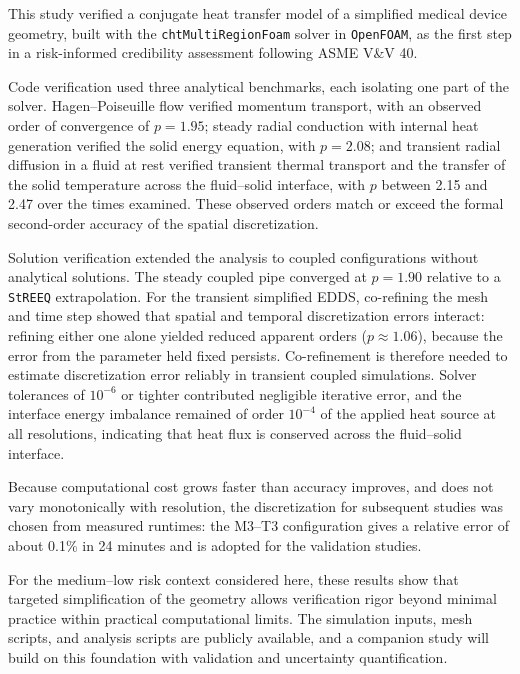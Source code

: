 This study verified a conjugate heat transfer model of a simplified medical device geometry, built with the \texttt{chtMultiRegionFoam} solver in \texttt{OpenFOAM}, as the first step in a risk-informed credibility assessment following ASME V\&V 40.

Code verification used three analytical benchmarks, each isolating one part of the solver. Hagen--Poiseuille flow verified momentum transport, with an observed order of convergence of $p = 1.95$; steady radial conduction with internal heat generation verified the solid energy equation, with $p = 2.08$; and transient radial diffusion in a fluid at rest verified transient thermal transport and the transfer of the solid temperature across the fluid--solid interface, with $p$ between 2.15 and 2.47 over the times examined. These observed orders match or exceed the formal second-order accuracy of the spatial discretization.

Solution verification extended the analysis to coupled configurations without analytical solutions. The steady coupled pipe converged at $p = 1.90$ relative to a \texttt{StREEQ} extrapolation. For the transient simplified EDDS, co-refining the mesh and time step showed that spatial and temporal discretization errors interact: refining either one alone yielded reduced apparent orders ($p \approx 1.06$), because the error from the parameter held fixed persists. Co-refinement is therefore needed to estimate discretization error reliably in transient coupled simulations. Solver tolerances of $10^{-6}$ or tighter contributed negligible iterative error, and the interface energy imbalance remained of order $10^{-4}$ of the applied heat source at all resolutions, indicating that heat flux is conserved across the fluid--solid interface.

Because computational cost grows faster than accuracy improves, and does not vary monotonically with resolution, the discretization for subsequent studies was chosen from measured runtimes: the M3--T3 configuration gives a relative error of about 0.1\% in 24 minutes and is adopted for the validation studies.

For the medium--low risk context considered here, these results show that targeted simplification of the geometry allows verification rigor beyond minimal practice within practical computational limits. The simulation inputs, mesh scripts, and analysis scripts are publicly available, and a companion study will build on this foundation with validation and uncertainty quantification.
